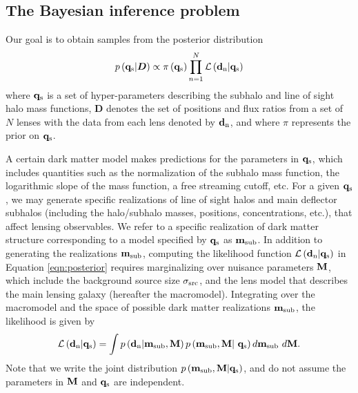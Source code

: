 \subsection{The Bayesian inference problem}
Our goal is to obtain samples from the posterior distribution 
\begin{equation}
\label{eqn:posterior}
p \left({\bf{q}_{\rm{s}}} | \boldsymbol{D} \right) \propto \pi \left({\bf{q}_{\rm{s}}}\right) \prod_{n=1}^{N} \mathcal{L} \left({\bf{d}_{\rm{n}}} | {\bf{q}_{\rm{s}}} \right) 
\end{equation}
where ${\bf{q}_{\rm{s}}}$ is a set of hyper-parameters describing the subhalo and line of sight halo mass functions, $\boldsymbol{D}$ denotes the set of positions and flux ratios from a set of $N$ lenses with the data from each lens denoted by ${\bf{d}_{\rm{n}}}$, and where $\pi$ represents the prior on ${\bf{q}_{\rm{s}}}$. 

A certain dark matter model makes predictions for the parameters in ${\bf{q}_{\rm{s}}}$, which includes quantities such as the normalization of the subhalo mass function, the logarithmic slope of the mass function, a free streaming cutoff, etc. For a given ${\bf{q}_{\rm{s}}}$, we may generate specific realizations of line of sight halos and main deflector subhalos (including the halo/subhalo masses, positions, concentrations, etc.), that affect lensing observables. We refer to a specific realization of dark matter structure corresponding to a model specified by ${\bf{q}_{\rm{s}}}$ as ${\bf{m}_{\rm{sub}}}$. In addition to generating the realizations ${\bf{m}_{\rm{sub}}}$, computing the likelihood function $\mathcal{L} \left({\bf{d}_{\rm{n}}} | {\bf{q}_{\rm{s}}} \right)$ in Equation \ref{eqn:posterior} requires marginalizing over nuisance parameters ${}{\bf{M}}$, which include the background source size $\sigma_{\rm{src}}$, and the lens model that describes the main lensing galaxy (hereafter the macromodel). Integrating over the macromodel and the space of possible dark matter realizations ${\bf{m}_{\rm{sub}}}$, the likelihood is given by
\begin{eqnarray}
\label{eqn:likelihood}
{\mathcal{L}} \left({\bf{d}_{\rm{n}}}| {\bf{q}_{\rm{s}}} \right) = \int p \left({\bf{d}_{\rm{n}}} | {\bf{m}_{\rm{sub}}}, {}{\bf{M}} \right) p \left( {\bf{m}_{\rm{sub}}}, {}{\bf{M}} | \ {\bf{q}_{\rm{s}}} \right) d {\bf{m}_{\rm{sub}}} \ d {}{\bf{M}}.
\end{eqnarray}
Note that we write the joint distribution $p\left({\bf{m}_{\rm{sub}}}, {\bf{M}} | {\bf{q}_{\rm{s}}}\right)$, and do not assume the parameters in ${}{\bf{M}}$ and ${\bf{q}_{\rm{s}}}$ are independent. 

